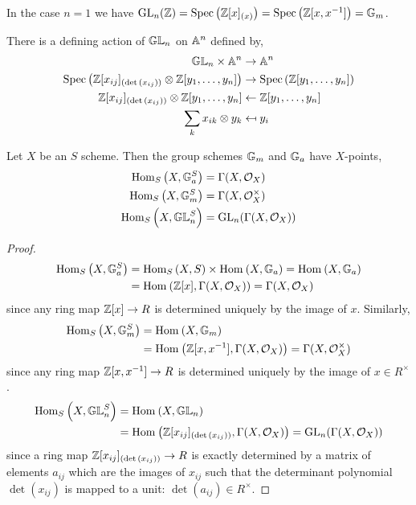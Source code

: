 \documentclass[12pt]{article}
\begin{document}
\begin{remark}
In the case $n=1$ we have $\mathrm{GL}_{n}(\mathbb{Z}) = \mathrm{Spec}\left( \mathbb{Z}[x]_{(x)} \right) = \mathrm{Spec}\left( \mathbb{Z}[x,x^{-1}] \right) = \mathbb{G}_m$.
\end{remark}

\begin{example}
There is a defining action of $\mathbb{GL}_{n}$ on $\mathbb{A}^n$ defined by,
\begin{align*}
\mathbb{GL}_{n} \times \mathbb{A}^{n} & \to \mathbb{A}^{n}
\\
\mathrm{Spec}\left( \mathbb{Z}[x_{ij}]_{(\det{(x_{ij})})} \otimes \mathbb{Z}[y_1, \dots, y_n] \right) & \to \mathrm{Spec}\left( \mathbb{Z}[y_1, \dots, y_n] \right)
\\
\mathbb{Z}[x_{ij}]_{(\det{(x_{ij})})} \otimes \mathbb{Z}[y_1, \dots, y_n] & \leftarrow \mathbb{Z}[y_1, \dots, y_n]
\\
\sum_k x_{ik} \otimes y_{k} & \mapsfrom y_{i} 
\end{align*}
\end{example}


\begin{lemma}
Let $X$ be an $S$ scheme. Then the group schemes $\mathbb{G}_m$ and $\mathbb{G}_a$ have $X$-points,
\begin{align*}
\mathrm{Hom}_{S} \left( X, \mathbb{G}_a^S \right) & = \Gamma(X, \mathcal{O}_{X})
\\
\mathrm{Hom}_{S} \left( X, \mathbb{G}_m^S \right) & = \Gamma(X, \mathcal{O}_{X}^\times)
\\
\mathrm{Hom}_{S} \left( X, \mathbb{GL}_{n}^S \right) & = \mathrm{GL}_{n}(\Gamma(X, \mathcal{O}_{X}))
\end{align*}
\end{lemma}

\begin{proof}
\begin{align*}
\mathrm{Hom}_{S} \left( X, \mathbb{G}_a^S \right) & = \mathrm{Hom}_{S} \left( X, S \right) \times \mathrm{Hom}_{}\left( X , \mathbb{G}_a \right) = \mathrm{Hom}_{}\left( X , \mathbb{G}_a \right) 
\\
& = \mathrm{Hom}_{}\left( \mathbb{Z}[x] , \Gamma(X, \mathcal{O}_{X}) \right) = \Gamma(X, \mathcal{O}_{X})
\end{align*}
since any ring map $\mathbb{Z}[x] \to R$ is determined uniquely by the image of $x$. Similarly,
\begin{align*}
\mathrm{Hom}_{S} \left( X, \mathbb{G}_m^S \right) & = \mathrm{Hom}_{}\left( X , \mathbb{G}_m \right) 
\\
& = \mathrm{Hom}_{}\left( \mathbb{Z}[x, x^{-1}] , \Gamma(X, \mathcal{O}_{X}) \right) = \Gamma(X, \mathcal{O}_{X}^\times)
\end{align*}
since any ring map $\mathbb{Z}[x, x^{-1}] \to R$ is determined uniquely by the image of $x \in R^\times$.
\begin{align*}
\mathrm{Hom}_{S} \left( X, \mathbb{GL}_{n}^S \right) & = \mathrm{Hom}_{}\left( X , \mathbb{GL}_{n} \right) 
\\ 
& = \mathrm{Hom}_{}\left( \mathbb{Z}[x_{ij}]_{(\det{(x_{ij})})} , \Gamma(X, \mathcal{O}_{X}) \right) = \mathrm{GL}_{n}(\Gamma(X, \mathcal{O}_{X})) 
\end{align*}
since a ring map $\mathbb{Z}[x_{ij}]_{(\det{(x_{ij})})} \to R$ is exactly determined by a matrix of elements $a_{ij}$ which are the images of $x_{ij}$ such that the determinant polynomial $\det{(x_{ij})}$ is mapped to a unit: $\det{(a_{ij})} \in R^\times$.
\end{proof}
\end{document}
